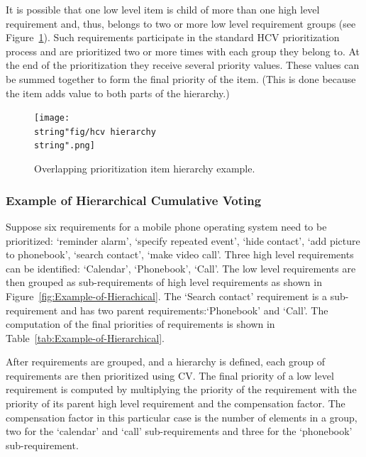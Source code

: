 It is possible that one low level item is child of more than one high
level requirement and, thus, belongs to two or more low level requirement
groups (see Figure~\ref{fig:Overlapping-Prioritization-Item}). Such
requirements participate in the standard HCV prioritization process and
are prioritized two or more times with each group they belong to.
At the end of the prioritization they receive several priority values.
These values can be summed together to form the final priority of the item.
(This is done because the item adds value to both parts of the hierarchy.)

\begin{figure}
	\center
\texttt{[image: \\string"fig/hcv hierarchy\\string".png]}
\caption{\label{fig:Overlapping-Prioritization-Item}Overlapping prioritization item hierarchy example.}
\end{figure}

\subsubsection{Example of Hierarchical Cumulative Voting}
Suppose six requirements
for a mobile phone operating system need to be prioritized: `reminder
alarm', `specify repeated event', `hide contact', `add picture to phonebook',
`search contact', `make video call'. Three high level requirements can
be identified: `Calendar', `Phonebook', `Call'. The low level requirements are then
grouped as sub-requirements of high level requirements as shown in
Figure~\ref{fig:Example-of-Hierachical}. The `Search contact' requirement is a 
sub-requirement and has two parent requirements:`Phonebook'
and `Call'. The computation of the final priorities of requirements is shown
in Table~\ref{tab:Example-of-Hierarchical}.

After requirements are grouped, and a hierarchy is defined, each group
of requirements are then prioritized using CV. The final priority of a low level
requirement is computed by multiplying the priority of the requirement
with the priority of its parent high level requirement and the compensation
factor. The compensation factor in this particular case is the number of elements
in a group, two for the `calendar' and `call' sub-requirements and three for
the `phonebook' sub-requirement.

